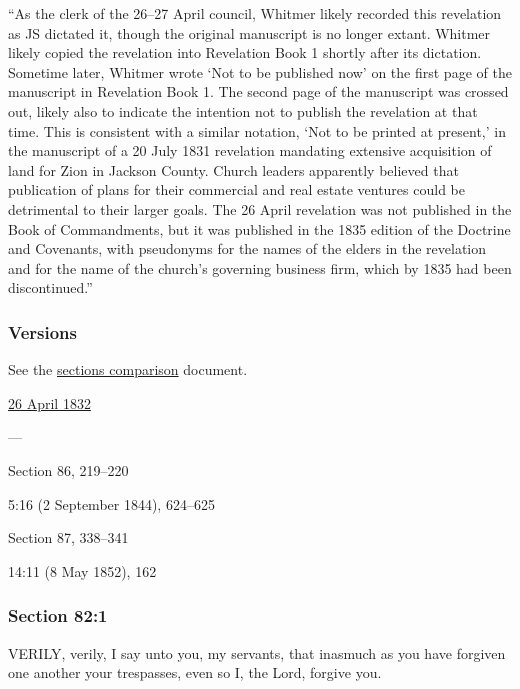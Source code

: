 			``As the clerk of the 26--27 April council, Whitmer likely recorded this revelation as JS dictated it, though the original manuscript is no longer extant. Whitmer likely copied the revelation into Revelation Book 1 shortly after its dictation. Sometime later, Whitmer wrote `Not to be published now' on the first page of the manuscript in Revelation Book 1. The second page of the manuscript was crossed out, likely also to indicate the intention not to publish the revelation at that time. This is consistent with a similar notation, `Not to be printed at present,' in the manuscript of a 20 July 1831 revelation mandating extensive acquisition of land for Zion in Jackson County. Church leaders apparently believed that publication of plans for their commercial and real estate ventures could be detrimental to their larger goals. The 26 April revelation was not published in the Book of Commandments, but it was published in the 1835 edition of the Doctrine and Covenants, with pseudonyms for the names of the elders in the revelation and for the name of the church's governing business firm, which by 1835 had been discontinued.''
		
	\subsubsection{Versions}
		\label{DC82-V}
		
		See the \href{https://drive.google.com/file/d/1goAvNz8jS4R8slYfMG_db55Ty2z_vmgK/view?usp=sharing}{sections comparison} document.
	
		\begin{compactdesc}
			\item[JSP] \hyperref[EMS-1832-JS-26-APR-1832]{26 April 1832}
			\item[BC] ---
			\item[DC 1835] Section 86, 219--220
			\item[TS] 5:16 (2 September 1844), 624--625
			\item[DC 1844] Section 87, 338--341
			\item[MS] 14:11 (8 May 1852), 162
		\end{compactdesc}

	\subsubsection{Section 82:1} %
		\label{DC82-1}

		VERILY, verily, I say unto you, my servants, that inasmuch as you have forgiven one another your trespasses, even so I, the Lord, forgive you.

